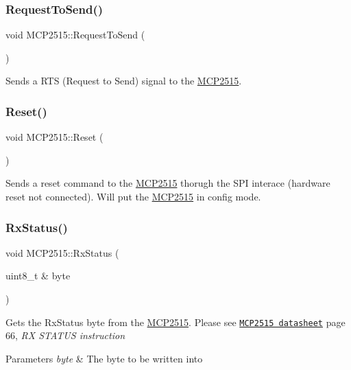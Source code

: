\subsubsection{\texorpdfstring{Request\+To\+Send()}{RequestToSend()}}
{\footnotesize\ttfamily void M\+C\+P2515\+::\+Request\+To\+Send (\begin{DoxyParamCaption}{ }\end{DoxyParamCaption})\hspace{0.3cm}{\ttfamily [private]}}

Sends a R\+TS (Request to Send) signal to the \hyperlink{class_m_c_p2515}{M\+C\+P2515}. \hypertarget{class_m_c_p2515_aa4d4138b984dc87116cf72ae104acb70}{}\label{class_m_c_p2515_aa4d4138b984dc87116cf72ae104acb70} 
\subsubsection{\texorpdfstring{Reset()}{Reset()}}
{\footnotesize\ttfamily void M\+C\+P2515\+::\+Reset (\begin{DoxyParamCaption}{ }\end{DoxyParamCaption})\hspace{0.3cm}{\ttfamily [private]}}

Sends a reset command to the \hyperlink{class_m_c_p2515}{M\+C\+P2515} thorugh the S\+PI interace (hardware reset not connected). Will put the \hyperlink{class_m_c_p2515}{M\+C\+P2515} in config mode. \hypertarget{class_m_c_p2515_af6853f82074a0be19d5a0516a959515e}{}\label{class_m_c_p2515_af6853f82074a0be19d5a0516a959515e} 
\subsubsection{\texorpdfstring{Rx\+Status()}{RxStatus()}}
{\footnotesize\ttfamily void M\+C\+P2515\+::\+Rx\+Status (\begin{DoxyParamCaption}\item[{uint8\+\_\+t \&}]{byte }\end{DoxyParamCaption})\hspace{0.3cm}{\ttfamily [private]}}

Gets the Rx\+Status byte from the \hyperlink{class_m_c_p2515}{M\+C\+P2515}. Please see \href{http://ww1.microchip.com/downloads/en/DeviceDoc/21801G.pdf}{\tt M\+C\+P2515 datasheet} page 66, {\itshape RX S\+T\+A\+T\+US instruction} 
\begin{DoxyParams}{Parameters}
{\em byte} & The byte to be written into \\
\hline
\end{DoxyParams}
\hypertarget{class_m_c_p2515_aa8c9fe944f7e6e99feb3f56a1c099a29}{}\label{class_m_c_p2515_aa8c9fe944f7e6e99feb3f56a1c099a29} 
